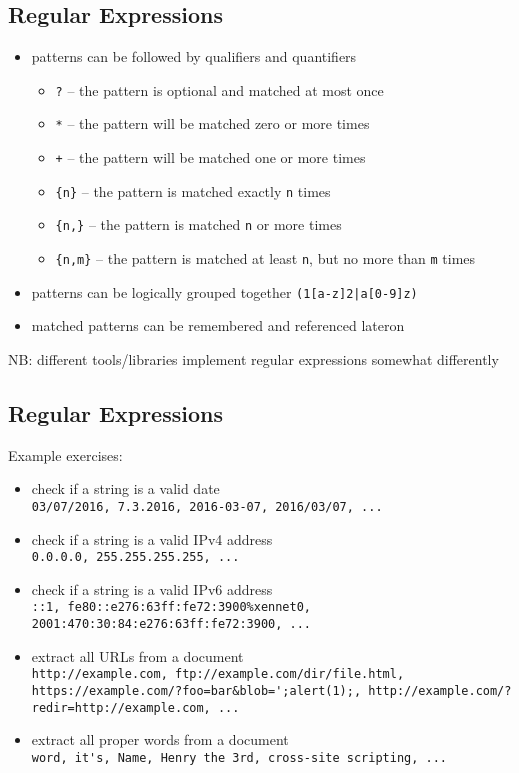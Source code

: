 \documentclass[xga]{xdvislides}
\begin{document}
\subsection{Regular Expressions}
\begin{itemize}
	\item patterns can be followed by qualifiers and quantifiers
		\begin{itemize}
			\item \verb+?+ -- the pattern is optional and matched at most once
			\item \verb+*+ -- the pattern will be matched zero or more times
			\item \verb|+| -- the pattern will be matched one or more times
			\item \verb+{n}+ -- the pattern is matched exactly \verb+n+ times
			\item \verb+{n,}+ -- the pattern is matched \verb+n+ or more times
			\item \verb+{n,m}+ -- the pattern is matched at least \verb+n+,
				but no more than \verb+m+ times
		\end{itemize}
	\item patterns can be logically grouped together \verb+(1[a-z]2|a[0-9]z)+
	\item matched patterns can be remembered and referenced lateron
\end{itemize}
\addvspace{.5in}
NB: different tools/libraries implement regular expressions somewhat differently

\subsection{Regular Expressions}
Example exercises:
\begin{itemize}
	\item check if a string is a valid date \\
		\verb+03/07/2016, 7.3.2016, 2016-03-07, 2016/03/07, ...+
	\item check if a string is a valid IPv4 address \\
		\verb+0.0.0.0, 255.255.255.255, ...+
	\item check if a string is a valid IPv6 address \\
		\verb+::1, fe80::e276:63ff:fe72:3900%xennet0, 2001:470:30:84:e276:63ff:fe72:3900, ...+
	\item extract all URLs from a document \\
		\verb+http://example.com, ftp://example.com/dir/file.html,+ \\
		\verb+https://example.com/?foo=bar&blob=';alert(1);, http://example.com/?redir=http://example.com, ...+
	\item extract all proper words from a document \\
		\verb+word, it's, Name, Henry the 3rd, cross-site scripting, ...+
\end{itemize}
\end{document}
